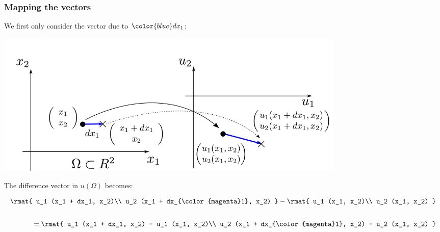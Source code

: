 \newpage

\subsubsection{Mapping the vectors}

\begin{frame}{\subsubsecname}

We first only consider the vector due to ${\color{blue}dx_1}$:

\svspace{-5mm}

\begin{center}
\includegraphics[width=0.75\textwidth]{img/x1.pdf}
\end{center}

\svspace{-3mm}

\pause

The difference vector in $u(\Omega)$ becomes:

\begin{equation}
\begin{array}{r}
\rmat{
u_1 (x_1 + dx_1, x_2)\\
u_2 (x_1 + dx_{\color{magenta}1}, x_2)
} - 
\rmat{
u_1 (x_1, x_2)\\
u_2 (x_1, x_2)
} \\[0.7cm]
=
\rmat{
u_1 (x_1 + dx_1, x_2) - u_1 (x_1, x_2)\\
u_2 (x_1 + dx_{\color{magenta}1}, x_2) - u_2 (x_1, x_2)
}
\end{array}
\end{equation}

\end{frame}

